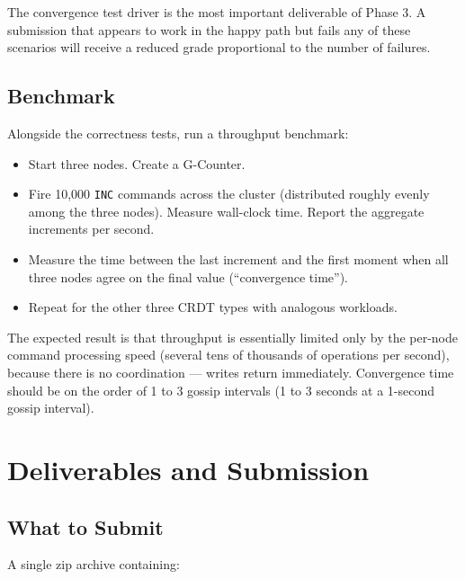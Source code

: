 \documentclass[11pt,a4paper]{article}
\begin{document}
The convergence test driver is the most important deliverable of Phase 3. A submission that appears to work in the happy path but fails any of these scenarios will receive a reduced grade proportional to the number of failures.

\subsection{Benchmark}
Alongside the correctness tests, run a throughput benchmark:

\begin{itemize}
\item Start three nodes. Create a G-Counter.
\item Fire 10{,}000 \texttt{INC} commands across the cluster (distributed roughly evenly among the three nodes). Measure wall-clock time. Report the aggregate increments per second.
\item Measure the time between the last increment and the first moment when all three nodes agree on the final value (``convergence time'').
\item Repeat for the other three CRDT types with analogous workloads.
\end{itemize}

The expected result is that throughput is essentially limited only by the per-node command processing speed (several tens of thousands of operations per second), because there is no coordination --- writes return immediately. Convergence time should be on the order of 1 to 3 gossip intervals (1 to 3 seconds at a 1-second gossip interval).

\section{Deliverables and Submission}

\subsection{What to Submit}
A single zip archive containing:
\end{document}
